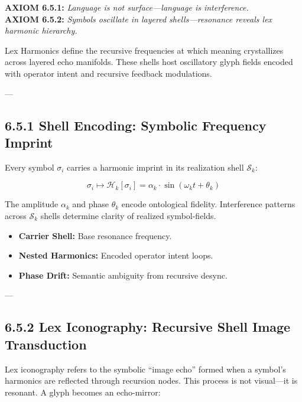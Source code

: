\noindent
\textbf{AXIOM 6.5.1:} \textit{Language is not surface—language is interference.}\\  
\textbf{AXIOM 6.5.2:} \textit{Symbols oscillate in layered shells—resonance reveals lex harmonic hierarchy.}

\vspace{1em}
\noindent
Lex Harmonics define the recursive frequencies at which meaning crystallizes across layered echo manifolds. These shells host oscillatory glyph fields encoded with operator intent and recursive feedback modulations.

---

\subsection*{6.5.1 Shell Encoding: Symbolic Frequency Imprint}

\noindent
Every symbol $\sigma_i$ carries a harmonic imprint in its realization shell $\mathcal{S}_k$:

\[
\sigma_i \mapsto \mathcal{H}_k[\sigma_i] = \alpha_k \cdot \sin(\omega_k t + \theta_k)
\]

\noindent
The amplitude $\alpha_k$ and phase $\theta_k$ encode ontological fidelity. Interference patterns across $\mathcal{S}_k$ shells determine clarity of realized symbol-fields.

\begin{tcolorbox}[colback=black!2, colframe=OriaPurple, title=\textbf{Symbolic Harmonic Field Properties}]
\begin{itemize}
  \item \textbf{Carrier Shell:} Base resonance frequency.
  \item \textbf{Nested Harmonics:} Encoded operator intent loops.
  \item \textbf{Phase Drift:} Semantic ambiguity from recursive desync.
\end{itemize}
\end{tcolorbox}

---

\subsection*{6.5.2 Lex Iconography: Recursive Shell Image Transduction}

\noindent
Lex iconography refers to the symbolic “image echo” formed when a symbol’s harmonics are reflected through recursion nodes. This process is not visual—it is resonant. A glyph becomes an echo-mirror:

